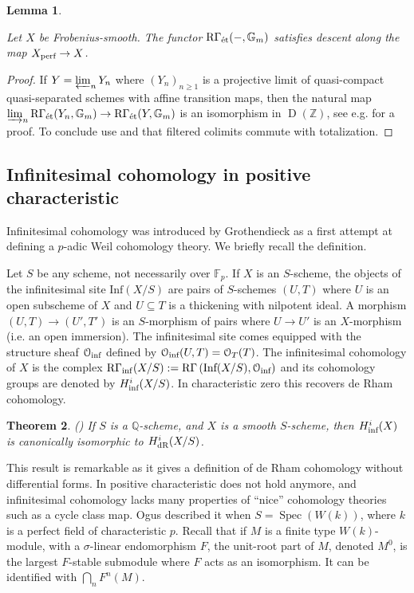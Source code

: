 \documentclass[11pt]{article}
\theoremstyle{plain}
\newtheorem{Thm}{Theorem}[subsection]
\newtheorem{Lem}[Thm]{Lemma}
\theoremstyle{definition}
\theoremstyle{remark}
\numberwithin{equation}{section}
\newcommand{\ssec}[2]{\subsection{#2}\label{SubS:#1}}
\newenvironment{thm}[1]%
    { \begin{Thm} \label{T:#1}}%
    { \end{Thm} }
\renewcommand{\th}[1]{\begin{thm}{#1} \sl }
\renewcommand{\eth}{\end{thm} }
\newenvironment{lemma}[1]%
    { \begin{Lem} \label{L:#1}}%
    { \end{Lem} }
\newcommand{\lem}[1]{\begin{lemma}{#1} \sl}
\newcommand{\elem}{\end{lemma}}
\newcommand{\prf}{ \begin{proof} }
\newcommand{\epr}{ \end{proof} }
\newcommand\Z{\mathbb{Z}}
\newcommand\Q{\mathbb{Q}}
\newcommand\calO{\mathcal{O}}
\newcommand{\Gm}{\mathbb{G}_m}
\newcommand{\Fp}{\mathbb{F}_p}
\DeclareMathOperator{\D}{D}                                              %
\DeclareMathOperator{\Rgam}{\text{R}\Gamma}                              %
\DeclareMathOperator{\Spec}{Spec}                                        %
\newcommand{\W}{W}                                                       %
\DeclareMathOperator{\Ret}{R\Gamma_{\textnormal{\'{e}t}}}                %
\newcommand\HdR[1]{H^{#1}_{\textnormal{dR}}}                             %
\newcommand\coperf[1]{#1_{\textnormal{perf}}}                            %
\newcommand\Inf{\text{Inf}}                                             %
\newcommand\oinf{\calO_{\textnormal{inf}}}                             %
\newcommand\Hinf[1]{H^{#1}_{\textnormal{inf}}}                         %
\DeclareMathOperator{\Rinf}{R\Gamma_{inf}}                             %
\begin{document}
\lem{discesaperfgm}

Let $X$ be Frobenius-smooth. The functor $\Ret(-,\Gm)$ satisfies descent along the map $\coperf{X}\to X$.

\elem

\prf

If $Y=\varprojlim_n Y_n$ where $(Y_n)_{n\ge1}$ is a projective limit of quasi-compact quasi-separated schemes with affine transition maps, then the natural map $\varinjlim_n\Ret(Y_n,\Gm)\to\Ret(Y,\Gm)$ is an isomorphism in $\D(\Z)$, see e.g. \cite[Lemma 3.3]{marcobrauer} for a proof. To conclude use  and that filtered colimits commute with totalization. \epr


\ssec{infinitesima}{Infinitesimal cohomology in positive characteristic} Infinitesimal cohomology was introduced by Grothendieck \cite{grothendieckinf} as a first attempt at defining a $p$-adic Weil cohomology theory. We briefly recall the definition.

Let $S$ be any scheme, not necessarily over $\Fp$. If $X$ is an $S$-scheme, the objects of the infinitesimal site $\Inf(X/S)$ are pairs of $S$-schemes $(U,T)$ where $U$ is an open subscheme of $X$ and $U\subseteq T$ is a thickening with nilpotent ideal. A morphism $(U,T)\to (U',T')$ is an $S$-morphism of pairs where $U\to U'$ is an $X$-morphism (i.e. an open immersion). The infinitesimal site comes equipped with the structure sheaf $\oinf$ defined by $\oinf(U,T)=\calO_T(T)$. The infinitesimal cohomology of $X$ is the complex $\Rinf(X/S):=\Rgam\left(\Inf(X/S),\oinf\right)$ and its cohomology groups are denoted by $\Hinf{i}(X/S)$. In characteristic zero this recovers de Rham cohomology.

\th{infinitesimacarzero}(\cite[Theorem 4.1]{grothendieckinf}) If $S$ is a $\Q$-scheme, and $X$ is a smooth $S$-scheme, then $\Hinf{i}(X)$ is canonically isomorphic to $\HdR{i}(X/S)$.
\eth

This result is remarkable as it gives a definition of de Rham cohomology without differential forms. In positive characteristic  does not hold anymore, and infinitesimal cohomology lacks many properties of ``nice'' cohomology theories such as a cycle class map. Ogus described it when $S=\Spec(\W(k))$, where $k$ is a perfect field of characteristic $p$. Recall that if $M$ is a finite type $\W(k)$-module, with a $\sigma$-linear endomorphism $F$, the unit-root part of $M$, denoted $M^0$, is the largest $F$-stable submodule where $F$ acts as an isomorphism. It can be identified with $\bigcap_nF^n(M)$.
\end{document}
